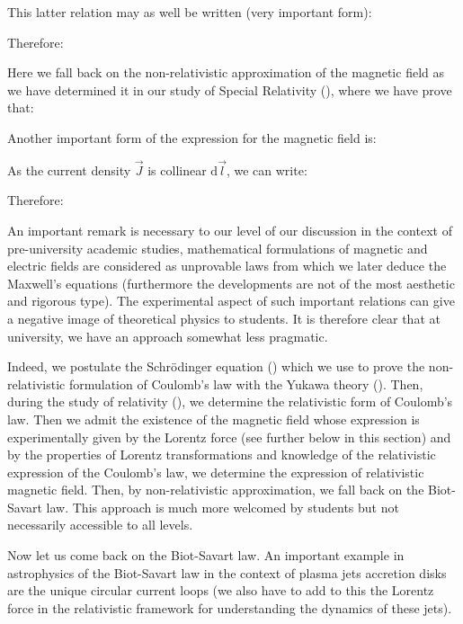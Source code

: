 	This latter relation may as well be written (very important form):
	
	Therefore:
	
	Here we fall back on the non-relativistic approximation of the magnetic field as we have determined it in our study of Special Relativity (), where we have prove that:
	
	Another important form of the expression for the magnetic field is:
	
	As the current density $\vec{J}$ is collinear $\mathrm{d}\vec{l}$, we can write:
	
	Therefore:
	
	An important remark is necessary to our level of our discussion in the context of pre-university academic studies, mathematical formulations of magnetic and electric fields are considered as unprovable laws from which we later deduce the Maxwell's equations (furthermore the developments are not of the most aesthetic and rigorous type). The experimental aspect of such important relations can give a negative image of theoretical physics to students. It is therefore clear that at university, we have an approach somewhat less pragmatic.
	
	Indeed, we postulate the Schrödinger equation () which we use to prove the non-relativistic formulation of Coulomb's law with the Yukawa theory (). Then, during the study of relativity (), we determine the relativistic form of Coulomb's law. Then we admit the existence of the magnetic field whose expression is experimentally given by the Lorentz force (see further below in this section) and by the properties of Lorentz transformations and knowledge of the relativistic expression of the Coulomb's law, we determine the expression of relativistic magnetic field. Then, by non-relativistic approximation, we fall back on the Biot-Savart law. This approach is much more welcomed by students but not necessarily accessible to all levels.
	
	Now let us come back on the Biot-Savart law. An important example in astrophysics of the Biot-Savart law in the context of plasma jets accretion disks are the unique circular current loops (we also have to add to this the Lorentz force in the relativistic framework for understanding the dynamics of these jets).
	
